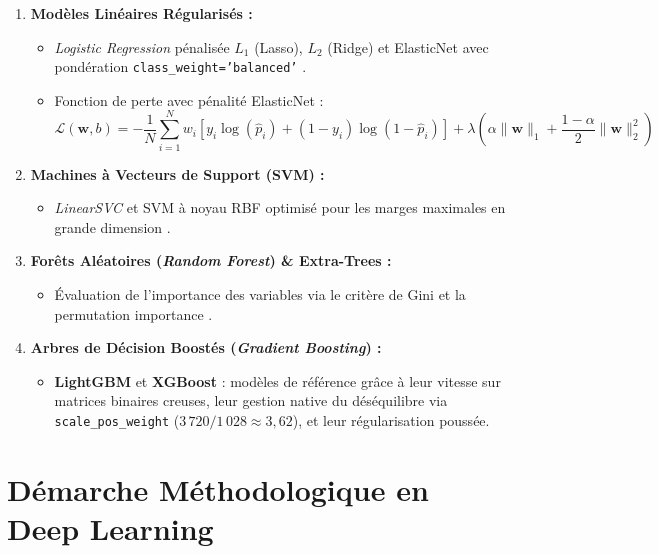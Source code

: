 \documentclass[11pt,a4paper]{article}
\begin{document}
\begin{enumerate}[leftmargin=*]
    \item \textbf{Modèles Linéaires Régularisés :}
    \begin{itemize}
        \item \textit{Logistic Regression} pénalisée $L_1$ (Lasso), $L_2$ (Ridge) et ElasticNet avec pondération \texttt{class\_weight='balanced'} \citep{tibshirani1996regression,zou2005regularization}.
        \item Fonction de perte avec pénalité ElasticNet :
        \[
        \mathcal{L}(\mathbf{w}, b) = -\frac{1}{N} \sum_{i=1}^N w_i \left[ y_i \log(\hat{p}_i) + (1-y_i) \log(1-\hat{p}_i) \right] + \lambda \left( \alpha \|\mathbf{w}\|_1 + \frac{1-\alpha}{2} \|\mathbf{w}\|_2^2 \right)
        \]
    \end{itemize}
    \item \textbf{Machines à Vecteurs de Support (SVM) :}
    \begin{itemize}
        \item \textit{LinearSVC} et SVM à noyau RBF optimisé pour les marges maximales en grande dimension \citep{cortes1995support}.
    \end{itemize}
    \item \textbf{Forêts Aléatoires (\textit{Random Forest}) \& Extra-Trees :}
    \begin{itemize}
        \item Évaluation de l'importance des variables via le critère de Gini et la permutation importance \citep{breiman2001random}.
    \end{itemize}
    \item \textbf{Arbres de Décision Boostés (\textit{Gradient Boosting}) :}
    \begin{itemize}
        \item \textbf{LightGBM} \citep{ke2017lightgbm} et \textbf{XGBoost} \citep{chen2016xgboost} : modèles de référence grâce à leur vitesse sur matrices binaires creuses, leur gestion native du déséquilibre via \texttt{scale\_pos\_weight} ($3\,720 / 1\,028 \approx 3,62$), et leur régularisation poussée.
    \end{itemize}
\end{enumerate}

\section{Démarche Méthodologique en Deep Learning}
\end{document}
